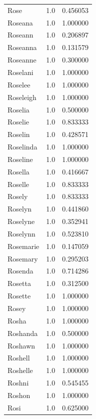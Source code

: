 \documentclass[
  letterpaper,
  DIV=11,
  numbers=noendperiod]{scrreprt}
\begin{document}
\begin{tabular}{lrr}
Rose            &   1.0 &   0.456053 \\
Roseana         &   1.0 &   1.000000 \\
Roseann         &   1.0 &   0.206897 \\
Roseanna        &   1.0 &   0.131579 \\
Roseanne        &   1.0 &   0.300000 \\
Roselani        &   1.0 &   1.000000 \\
Roselee         &   1.0 &   1.000000 \\
Roseleigh       &   1.0 &   1.000000 \\
Roselia         &   1.0 &   0.500000 \\
Roselie         &   1.0 &   0.833333 \\
Roselin         &   1.0 &   0.428571 \\
Roselinda       &   1.0 &   1.000000 \\
Roseline        &   1.0 &   1.000000 \\
Rosella         &   1.0 &   0.416667 \\
Roselle         &   1.0 &   0.833333 \\
Rosely          &   1.0 &   0.833333 \\
Roselyn         &   1.0 &   0.441860 \\
Roselyne        &   1.0 &   0.352941 \\
Roselynn        &   1.0 &   0.523810 \\
Rosemarie       &   1.0 &   0.147059 \\
Rosemary        &   1.0 &   0.295203 \\
Rosenda         &   1.0 &   0.714286 \\
Rosetta         &   1.0 &   0.312500 \\
Rosette         &   1.0 &   1.000000 \\
Rosey           &   1.0 &   1.000000 \\
Rosha           &   1.0 &   1.000000 \\
Roshanda        &   1.0 &   0.500000 \\
Roshawn         &   1.0 &   1.000000 \\
Roshell         &   1.0 &   1.000000 \\
Roshelle        &   1.0 &   1.000000 \\
Roshni          &   1.0 &   0.545455 \\
Roshon          &   1.0 &   1.000000 \\
Rosi            &   1.0 &   0.625000 \\

\end{tabular}
\end{document}
